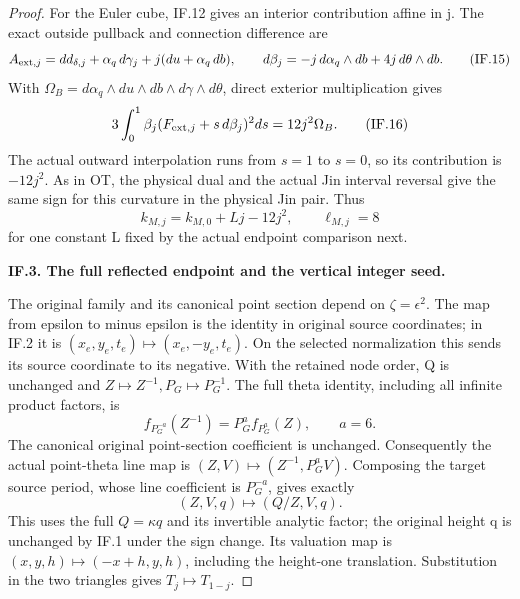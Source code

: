 \begin{proof}
For the Euler cube, IF.12 gives an interior contribution affine in j.
The exact outside pullback and connection difference are
\[
 A_{{\rm ext},j}=dd_{\delta,j}+\alpha_q\,d\gamma_j
                         +j(du+\alpha_q\,db),\qquad
 d\beta_j=-j\,d\alpha_q\wedge db+4j\,d\theta\wedge db.
 \tag{IF.15}
\]
With \(\Omega_B=d\alpha_q\wedge du\wedge db\wedge d\gamma
\wedge d\theta\), direct exterior multiplication gives
\[
 3\int_0^1\beta_j(F_{{\rm ext},j}+s\,d\beta_j)^2ds
                         =12j^2\Omega_B.
 \tag{IF.16}
\]
The actual outward interpolation runs from \(s=1\) to \(s=0\), so its
contribution is \(-12j^2\).  As in OT, the physical dual and the actual
Jin interval reversal give the same sign for this curvature in the
physical Jin pair.  Thus
\[
        k_{M,j}=k_{M,0}+Lj-12j^2,\qquad \ell_{M,j}=8
 \tag{IF.17}
\]
for one constant L fixed by the actual endpoint comparison next.

\par\medskip\noindent\textbf{IF.3. The full reflected endpoint and the vertical integer seed.}\par\nopagebreak[4]

The original family and its canonical point section depend on
\(\zeta=\epsilon^2\).  The map from epsilon to minus epsilon is
the identity in original source coordinates; in IF.2 it is
\((x_e,y_e,t_e)\mapsto(x_e,-y_e,t_e)\).  On the selected
normalization this sends its source coordinate to its negative.
With the retained node order, Q is unchanged and
\(Z\mapsto Z^{-1}, P_G\mapsto P_G^{-1}\).  The full theta
identity, including all infinite product factors, is
\[
 f_{P_G^{-a}}(Z^{-1})=P_G^a f_{P_G^a}(Z),\qquad a=6.
 \tag{IF.18}
\]
The canonical original point-section coefficient is unchanged.
Consequently the actual point-theta line map is
\((Z,V)\mapsto(Z^{-1},P_G^aV)\).  Composing the target source
period, whose line coefficient is \(P_G^{-a}\), gives exactly
\[
                         (Z,V,q)\longmapsto(Q/Z,V,q).
 \tag{IF.19}
\]
This uses the full \(Q=\kappa q\) and its invertible analytic factor;
the original height q is unchanged by IF.1 under the sign change.
Its valuation map is
\((x,y,h)\mapsto(-x+h,y,h)\), including the height-one
translation.  Substitution in the two triangles gives
\(T_j\mapsto T_{1-j}\).


\end{proof}

